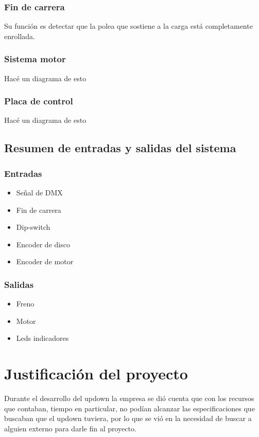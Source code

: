 \subsubsection{Fin de carrera}
Su función es detectar que la polea que sostiene a la carga está completamente enrollada.

\subsubsection{Sistema motor}
\textcolor{FIXME}{Hacé un diagrama de esto}

\subsubsection{Placa de control}
\textcolor{FIXME}{Hacé un diagrama de esto}


\subsection{Resumen de entradas y salidas del sistema}
\subsubsection{Entradas}
\begin{itemize}
	\item Señal de DMX
	\item Fin de carrera
	\item Dip-switch
	\item Encoder de disco
	\item Encoder de motor
\end{itemize}

\subsubsection{Salidas}
\begin{itemize}
	\item Freno
	\item Motor
	\item Leds indicadores
\end{itemize}


\section{Justificación del proyecto}
Durante el desarrollo del updown la empresa se dió cuenta que con los recursos que contaban, tiempo en particular, no podían alcanzar las especificaciones que buscaban que el updown tuviera, por lo que se vió en la necesidad de buscar a alguien externo para darle fin al proyecto.\\

